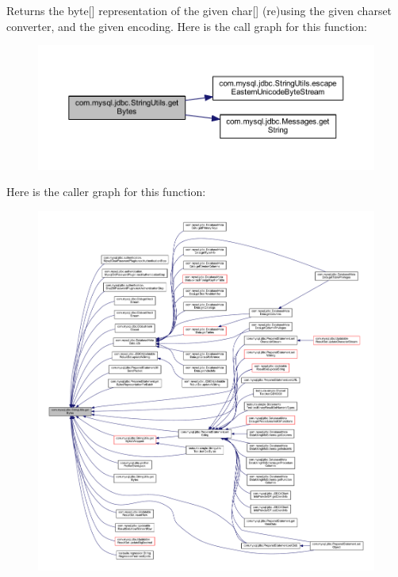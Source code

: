 Returns the byte\mbox{[}\mbox{]} representation of the given char\mbox{[}\mbox{]} (re)using the given charset converter, and the given encoding. Here is the call graph for this function\+:
\nopagebreak
\begin{figure}[H]
\begin{center}
\leavevmode
\includegraphics[width=350pt]{classcom_1_1mysql_1_1jdbc_1_1_string_utils_ab237c5e450dc15a76201b3f13d44e6b3_cgraph}
\end{center}
\end{figure}
Here is the caller graph for this function\+:
\nopagebreak
\begin{figure}[H]
\begin{center}
\leavevmode
\includegraphics[width=350pt]{classcom_1_1mysql_1_1jdbc_1_1_string_utils_ab237c5e450dc15a76201b3f13d44e6b3_icgraph}
\end{center}
\end{figure}
\mbox{\label{classcom_1_1mysql_1_1jdbc_1_1_string_utils_afa77878bbb64c7649486eab195b72185}} 
